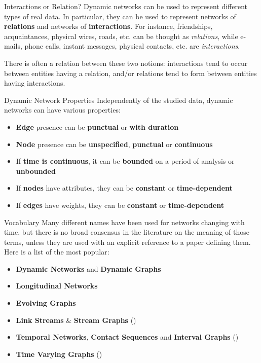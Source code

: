 \documentclass[a4paper,11pt]{book}
\begin{document}
\begin{textbox}{Interactions or Relation?}
Dynamic networks can be used to represent different types of real data. In particular, they can be used to represent networks of \textbf{relations} and networks of \textbf{interactions}. For instance, friendships, acquaintances, physical wires, roads, etc. can be thought as \textit{relations}, while e-mails, phone calls, instant messages, physical contacts, etc. are \textit{interactions}.

There is often a relation between these two notions: interactions tend to occur between entities having a relation, and/or relations tend to form between entities having interactions.
\end{textbox}

\begin{textbox}{Dynamic Network Properties}
Independently of the studied data, dynamic networks can have various properties:
\begin{itemize}
    \item \textbf{Edge} presence can be \textbf{punctual} or \textbf{with duration}
    \item \textbf{Node} presence can be \textbf{unspecified}, \textbf{punctual} or \textbf{continuous}
    \item If \textbf{time is continuous}, it can be \textbf{bounded} on a period of analysis or \textbf{unbounded}
    \item If \textbf{nodes} have attributes, they can be \textbf{constant} or \textbf{time-dependent}
    \item If \textbf{edges} have weights, they can be \textbf{constant} or \textbf{time-dependent}
\end{itemize}
\end{textbox}






\begin{textbox}{Vocabulary}
Many different names have been used for networks changing with time, but there is no broad consensus in the literature on the meaning of those terms, unless they are used with an explicit reference to a paper defining them. Here is a list of the most popular:
\begin{itemize}
    \item \textbf{Dynamic Networks} and \textbf{Dynamic Graphs}
    \item \textbf{Longitudinal Networks}
    \item \textbf{Evolving Graphs}
    \item \textbf{Link Streams} \& \textbf{Stream Graphs} (\cite{latapy2018stream})
    \item \textbf{Temporal Networks}, \textbf{Contact Sequences} and \textbf{Interval Graphs} (\cite{holme2012temporal})
    \item \textbf{Time Varying Graphs} (\cite{casteigts2012time})
\end{itemize}
\end{textbox}
\end{document}
